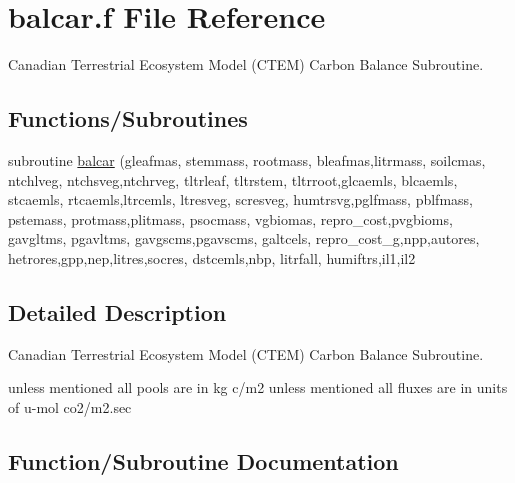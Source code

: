 \hypertarget{balcar_8f}{}\section{balcar.\+f File Reference}
\label{balcar_8f}


Canadian Terrestrial Ecosystem Model (C\+T\+E\+M) Carbon Balance Subroutine.  


\subsection*{Functions/\+Subroutines}
\begin{DoxyCompactItemize}
\item 
subroutine \hyperlink{balcar_8f_a69cb15ca4498ee70127f18c2c9f7852b}{balcar} (gleafmas, stemmass, rootmass, bleafmas,litrmass, soilcmas, ntchlveg, ntchsveg,ntchrveg, tltrleaf, tltrstem, tltrroot,glcaemls, blcaemls, stcaemls, rtcaemls,ltrcemls, ltresveg, scresveg, humtrsvg,pglfmass, pblfmass, pstemass, protmass,plitmass, psocmass, vgbiomas, repro\+\_\+cost,pvgbioms, gavgltms, pgavltms, gavgscms,pgavscms, galtcels, repro\+\_\+cost\+\_\+g,npp,autores, hetrores,gpp,nep,litres,socres, dstcemls,nbp, litrfall, humiftrs,il1,il2
\end{DoxyCompactItemize}


\subsection{Detailed Description}
Canadian Terrestrial Ecosystem Model (C\+T\+E\+M) Carbon Balance Subroutine. 

unless mentioned all pools are in kg c/m2 unless mentioned all fluxes are in units of u-\/mol co2/m2.\+sec 

\subsection{Function/\+Subroutine Documentation}
\hypertarget{balcar_8f_a69cb15ca4498ee70127f18c2c9f7852b}{}
